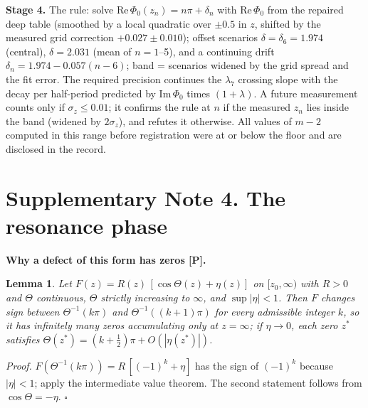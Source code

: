 \documentclass[10pt]{article}
\newcommand{\ReP}{\mathrm{Re}\,\Phi_0}
\newcommand{\ImP}{\mathrm{Im}\,\Phi_0}
\newtheorem*{lemma}{Lemma}
\begin{document}
\textbf{Stage 4.} The rule: solve $\ReP(z_n)=n\pi+\delta_n$ with $\ReP$ from the repaired deep table (smoothed by a
local quadratic over $\pm0.5$ in $z$, shifted by the measured grid correction $+0.027\pm0.010$); offset scenarios
$\delta=\delta_6=1.974$ (central), $\delta=2.031$ (mean of $n=1$--5), and a continuing drift
$\delta_n=1.974-0.057(n-6)$; band = scenarios widened by the grid spread and the fit error. The required precision
continues the $\lambda_7$ crossing slope with the decay per half-period predicted by $\ImP$ times $(1+\lambda)$. A future
measurement counts only if $\sigma_z\le0.01$; it confirms the rule at $n$ if the measured $z_n$ lies inside the band
(widened by $2\sigma_z$), and refutes it otherwise. All values of $m-2$ computed in this range before registration were
at or below the floor and are disclosed in the record.

\begin{table}[h]
\centering
\caption{\textbf{Stage-4 predictions and the precision a test needs} (\texttt{ipm\_stage4\_predictions.out}).}
\label{tab:stage4}
\footnotesize
\setlength{\tabcolsep}{3pt}

\end{table}

\section*{Supplementary Note 4. The resonance phase}

\textbf{Why a defect of this form has zeros [P].}
\begin{lemma}
Let $F(z)=R(z)\,[\cos\Theta(z)+\eta(z)]$ on $[z_0,\infty)$ with $R>0$ and $\Theta$ continuous, $\Theta$ strictly
increasing to $\infty$, and $\sup|\eta|<1$. Then $F$ changes sign between $\Theta^{-1}(k\pi)$ and $\Theta^{-1}((k+1)\pi)$
for every admissible integer $k$, so it has infinitely many zeros accumulating only at $z=\infty$; if $\eta\to0$, each
zero $z^*$ satisfies $\Theta(z^*)=(k+\tfrac12)\pi+O(|\eta(z^*)|)$.
\end{lemma}
\textit{Proof.} $F(\Theta^{-1}(k\pi))=R\,[(-1)^k+\eta]$ has the sign of $(-1)^k$ because $|\eta|<1$; apply the
intermediate value theorem. The second statement follows from $\cos\Theta=-\eta$. $\square$
\end{document}
